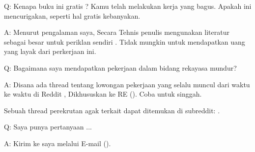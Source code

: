 \par Q: Kenapa buku ini gratis ? Kamu telah melakukan kerja yang bagus. Apakah ini mencurigakan, seperti hal gratis kebanyakan.
\par A: Menurut pengalaman saya, Secara Tehnis penulis mengunakan literatur sebagai besar untuk periklan sendiri . Tidak mungkin untuk mendapatkan uang yang layak dari perkerjaan ini.

\par Q: Bagaimana saya mendapatkan pekerjaan dalam bidang rekayasa mundur?
\par A: Disana ada thread tentang lowongan pekerjaan yang selalu muncul dari waktu ke waktu di Reddit , Dikhususkan ke RE\FNURLREDDIT{}
(\RedditHiringThread{}).
Coba untuk singgah.

Sebuah thread perekrutan agak terkait dapat ditemukan di  subreddit: \NetsecHiringThread{}.

\par Q: Saya punya pertanyaan ...
\par A: Kirim ke saya melalui E-mail (\EMAIL).
